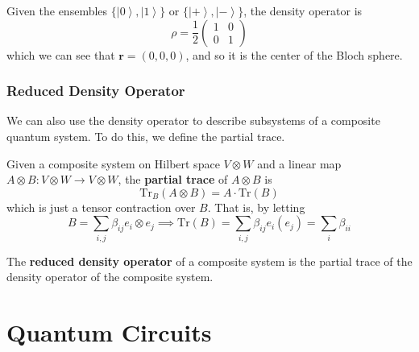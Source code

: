 \documentclass{article}
\newcommand{\ket}[1]{\ensuremath{\left|#1\right\rangle}}
\begin{document}
      \begin{example}
        Given the ensembles $\{\ket{0}, \ket{1}\}$ or $\{\ket{+}, \ket{-}\}$, the density operator is 
        \begin{equation}
          \rho = \frac{1}{2} \begin{pmatrix} 1 & 0 \\ 0 & 1 \end{pmatrix}
        \end{equation}
        which we can see that $\mathbf{r} = (0, 0, 0)$, and so it is the center of the Bloch sphere. 
      \end{example}

    \subsubsection{Reduced Density Operator}
      
      We can also use the density operator to describe subsystems of a composite quantum system. To do this, we define the partial trace. 

      \begin{definition}
        Given a composite system on Hilbert space $V \otimes W$ and a linear map $A \otimes B: V \otimes W \rightarrow V \otimes W$, the \textbf{partial trace} of $A \otimes B$ is 
        \begin{equation}
          \mathrm{Tr}_B (A \otimes B) = A \cdot \mathrm{Tr}(B)
        \end{equation}
        which is just a tensor contraction over $B$. That is, by letting 
        \begin{equation}
          B = \sum_{i, j} \beta_{ij} e_i \otimes e_j \implies \mathrm{Tr}(B) = \sum_{i, j} \beta_{ij} e_i (e_j) = \sum_i \beta_{ii}
        \end{equation}
      \end{definition}

      \begin{definition}
        The \textbf{reduced density operator} of a composite system is the partial trace of the density operator of the composite system. 
      \end{definition}

\section{Quantum Circuits}
\end{document}
